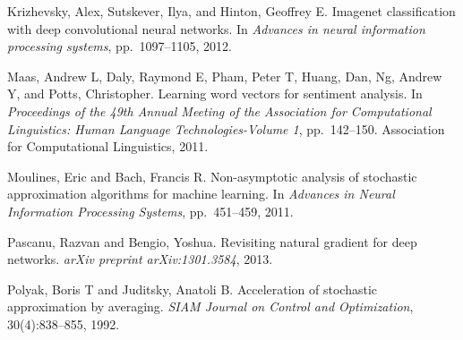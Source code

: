 \documentclass[11pt]{article}
\begin{document}
\begin{list}{}{%
  \setlength{\leftmargin}{1.5em}%
  \setlength{\itemindent}{-1.5em}%
  \setlength{\itemsep}{0.5em}%
  \setlength{\parsep}{0pt}%
}
\item Krizhevsky, Alex, Sutskever, Ilya, and Hinton, Geoffrey E.
Imagenet classification with deep convolutional neural networks.
In \emph{Advances in neural information processing systems},
pp.~1097--1105, 2012.

\item Maas, Andrew L, Daly, Raymond E, Pham, Peter T, Huang,
Dan, Ng, Andrew Y, and Potts, Christopher. Learning word vectors
for sentiment analysis. In \emph{Proceedings of the 49th Annual
Meeting of the Association for Computational Linguistics: Human
Language Technologies-Volume 1}, pp.~142--150. Association for
Computational Linguistics, 2011.

\item Moulines, Eric and Bach, Francis R. Non-asymptotic
analysis of stochastic approximation algorithms for machine
learning. In \emph{Advances in Neural Information Processing
Systems}, pp.~451--459, 2011.

\item Pascanu, Razvan and Bengio, Yoshua. Revisiting natural
gradient for deep networks. \emph{arXiv preprint
arXiv:1301.3584}, 2013.

\item Polyak, Boris T and Juditsky, Anatoli B. Acceleration of
stochastic approximation by averaging. \emph{SIAM Journal on
Control and Optimization}, 30(4):838--855, 1992.

\end{list}


\newpage

\setcounter{equation}{12}
\end{document}
